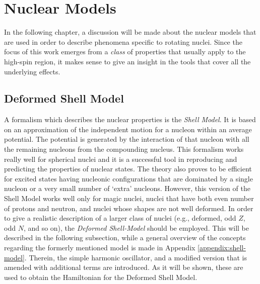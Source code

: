 \chapter{Nuclear Models}
\label{chapter-3}

In the following chapter, a discussion will be made about the nuclear models that are used in order to describe phenomena specific to rotating nuclei. Since the focus of this work emerges from a \emph{class} of properties that usually apply to the high-spin region, it makes sense to give an insight in the tools that cover all the underlying effects.

\section{Deformed Shell Model}

A formalism which describes the nuclear properties is the \emph{Shell Model}. It is based on an approximation of the independent motion for a nucleon within an average potential. The potential is generated by the interaction of that nucleon with all the remaining nucleons from the compounding nucleus. This formalism works really well for spherical nuclei and it is a successful tool in reproducing and predicting the properties of nuclear states. The theory also proves to be efficient for excited states having nucleonic configurations that are dominated by a single nucleon or a very small number of `extra' nucleons. However, this version of the Shell Model works well only for magic nuclei, nuclei that have both even number of protons and neutron, and nuclei whose shapes are not well deformed. In order to give a realistic description of a larger class of nuclei (e.g., deformed, odd $Z$, odd $N$, and so on), the \emph{Deformed Shell-Model} should be employed. This will be described in the following subsection, while a general overview of the concepts regarding the formerly mentioned model is made in Appendix \ref{appendix:shell-model}. Therein, the simple harmonic oscillator, and a modified version that is amended with additional terms are introduced. As it will be shown, these are used to obtain the Hamiltonian for the Deformed Shell Model.


